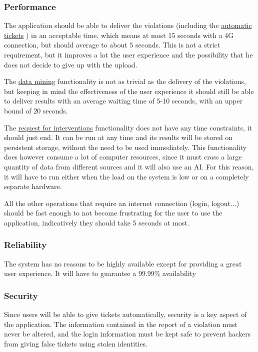 \subsubsection{Performance}
    The application should be able to deliver the violations (including the
    \hyperref[sec:automatic_tickets]{automatic tickets}
    ) in an acceptable time,
    which means at most 15 seconds with a 4G connection, but should average to about 5 seconds.
    This is not a strict requirement, but it improves a lot the user experience and the possibility
    that he does not decide to give up with the upload.

    The 
    \hyperref[sec:data_mining]{data mining}
    functionality is not as trivial as the delivery of the violations, but keeping in
    mind the effectiveness of the user experience it should still be able to deliver results with an
    average waiting time of 5-10 seconds, with an upper bound of 20 seconds.

    The
    \hyperref[sec:request_for_interventions]{request for interventions}
    functionality does not have any time constraints, it should just end. It can be run at any time and
    its results will be stored on persistent storage, without the need to be used immediately.
    This functionality does however consume a lot of computer resources, since it must cross a large quantity
    of data from different sources and it will also use an AI. For this reason, it will have to run
    either when the load on the system is low or on a completely separate hardware.

    All the other operations that require an internet connection (login, logout...) should be fast enough
    to not become frustrating for the user to use the application, indicatively they should take 5 seconds at most.

\subsubsection{Reliability}
    The system has no reasons to be highly available except for providing a great user experience.
    It will have to guarantee a 99.99\% availability

\subsubsection{Security}
    Since users will be able to give tickets automatically, security is a key aspect of the application.
    The information contained in the report of a violation must never be altered, and the login information
    must be kept safe to prevent hackers from giving false tickets using stolen identities.
    
